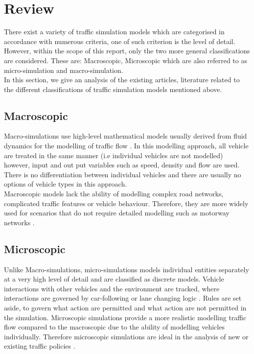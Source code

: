 \section{Review}
There exist a variety of traffic simulation models which are categorised in accordance with numerous criteria, one of such criterion is the level of detail. However, within the scope of this report, only the two more  general classifications are considered. These are: Macroscopic, Microscopic which are also referred to as micro-simulation and macro-simulation. \\
In this section, we give an analysis of the existing articles, literature related to the different classifications of traffic simulation models mentioned above.

\subsection*{Macroscopic}
Macro-simulations use high-level mathematical models usually derived from fluid dynamics for the modelling of traffic flow \cite{Ali, Serge} .
In this modelling approach, all vehicle are treated in the same manner (i.e individual vehicles are not modelled) however, input and out put variables such as speed, density and flow are used. There is no differentiation between individual vehicles and there are usually no options of vehicle types in this approach.\\
Macroscopic models lack the ability of modelling complex road networks, complicated traffic features or vehicle behaviour. Therefore, they are more widely used for scenarios that do not require detailed modelling such as motorway networks \cite{Schulze}.

\subsection*{Microscopic}
Unlike Macro-simulations, micro-simulations models individual entities separately at a very high level of detail and are classified as discrete models. Vehicle interactions with other vehicles and the environment are tracked, where interactions are governed by car-following or lane changing logic \cite{Ali}. Rules are set aside, to govern what action are permitted and what action are not permitted in the simulation. Microscopic simulations provide a more realistic modelling  traffic flow compared to the macroscopic due to the ability of modelling vehicles individually. Therefore microscopic simulations are ideal in the analysis of new or existing traffic policies \cite{Ali, Femke}.

